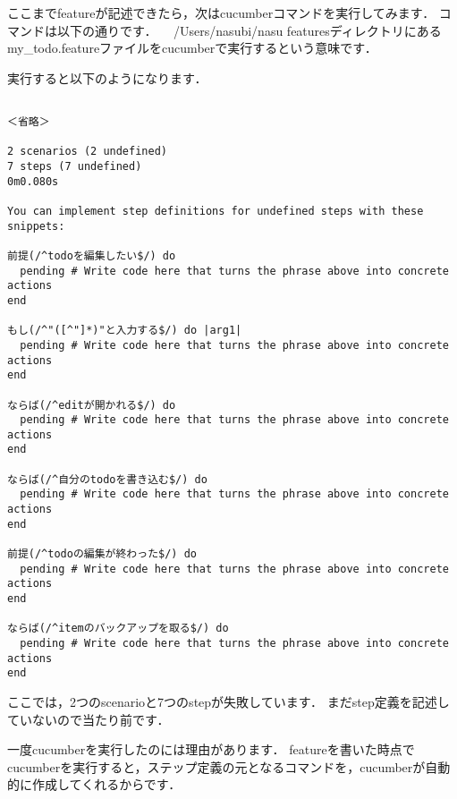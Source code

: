 ここまでfeatureが記述できたら，次はcucumberコマンドを実行してみます．
コマンドは以下の通りです．
　/Users/nasubi/nasu%
featuresディレクトリにあるmy\_todo.featureファイルをcucumberで実行するという意味です．

実行すると以下のようになります．
\begin{lstlisting}[style=customCsh]

＜省略＞

2 scenarios (2 undefined)
7 steps (7 undefined)
0m0.080s

You can implement step definitions for undefined steps with these snippets:

前提(/^todoを編集したい$/) do
  pending # Write code here that turns the phrase above into concrete actions
end

もし(/^"([^"]*)"と入力する$/) do |arg1|
  pending # Write code here that turns the phrase above into concrete actions
end

ならば(/^editが開かれる$/) do
  pending # Write code here that turns the phrase above into concrete actions
end

ならば(/^自分のtodoを書き込む$/) do
  pending # Write code here that turns the phrase above into concrete actions
end

前提(/^todoの編集が終わった$/) do
  pending # Write code here that turns the phrase above into concrete actions
end

ならば(/^itemのバックアップを取る$/) do
  pending # Write code here that turns the phrase above into concrete actions
end
\end{lstlisting}
ここでは，2つのscenarioと7つのstepが失敗しています．
まだstep定義を記述していないので当たり前です．

一度cucumberを実行したのには理由があります．
featureを書いた時点でcucumberを実行すると，ステップ定義の元となるコマンドを，cucumberが自動的に作成してくれるからです．

